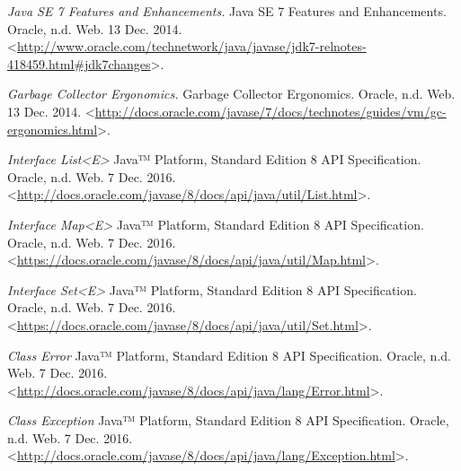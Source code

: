 \begin{thebibliography}{21}

\textit{Java SE 7 Features and Enhancements.} Java SE 7 Features and Enhancements. Oracle, n.d. Web. 13 Dec. 2014. <\url{http://www.oracle.com/technetwork/java/javase/jdk7-relnotes-418459.html#jdk7changes}>.


\textit{Garbage Collector Ergonomics.} Garbage Collector Ergonomics. Oracle, n.d. Web. 13 Dec. 2014. <\url{http://docs.oracle.com/javase/7/docs/technotes/guides/vm/gc-ergonomics.html}>.


\textit{Interface List<E>} Java™ Platform, Standard Edition 8
API Specification. Oracle, n.d. Web. 7 Dec. 2016. <\url{http://docs.oracle.com/javase/8/docs/api/java/util/List.html}>.


\textit{Interface Map<E>} Java™ Platform, Standard Edition 8
API Specification. Oracle, n.d. Web. 7 Dec. 2016. <\url{https://docs.oracle.com/javase/8/docs/api/java/util/Map.html}>.


\textit{Interface Set<E>} Java™ Platform, Standard Edition 8
API Specification. Oracle, n.d. Web. 7 Dec. 2016. <\url{https://docs.oracle.com/javase/8/docs/api/java/util/Set.html}>.


\textit{Class Error} Java™ Platform, Standard Edition 8
API Specification. Oracle, n.d. Web. 7 Dec. 2016. <\url{http://docs.oracle.com/javase/8/docs/api/java/lang/Error.html}>.


\textit{Class Exception} Java™ Platform, Standard Edition 8
API Specification. Oracle, n.d. Web. 7 Dec. 2016. <\url{http://docs.oracle.com/javase/8/docs/api/java/lang/Exception.html}>.


\end{thebibliography}
